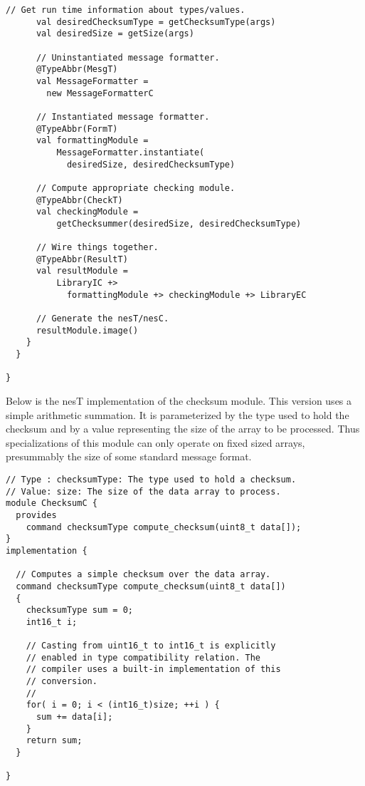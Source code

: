 \begin{lstlisting}[language=scalaness]
      // Get run time information about types/values.
      val desiredChecksumType = getChecksumType(args)
      val desiredSize = getSize(args)

      // Uninstantiated message formatter.
      @TypeAbbr(MesgT)
      val MessageFormatter =
        new MessageFormatterC

      // Instantiated message formatter.
      @TypeAbbr(FormT)
      val formattingModule =
          MessageFormatter.instantiate(
            desiredSize, desiredChecksumType)

      // Compute appropriate checking module.
      @TypeAbbr(CheckT)
      val checkingModule =
          getChecksummer(desiredSize, desiredChecksumType)
      
      // Wire things together.
      @TypeAbbr(ResultT)
      val resultModule =
          LibraryIC +>
            formattingModule +> checkingModule +> LibraryEC

      // Generate the nesT/nesC.
      resultModule.image()
    }
  }

}       
\end{lstlisting}
\vspace{1.0ex}
\primaryspacing

Below is the nesT implementation of the checksum module. This version uses a simple
arithmetic summation. It is parameterized by the type used to hold the checksum and by a value
representing the size of the array to be processed. Thus specializations of this module can only
operate on fixed sized arrays, presummably the size of some standard message format.

\singlespace
\vspace{1.0ex}
\begin{lstlisting}[language=nesC]
// Type : checksumType: The type used to hold a checksum.
// Value: size: The size of the data array to process.
module ChecksumC {
  provides
    command checksumType compute_checksum(uint8_t data[]);
}
implementation {
   
  // Computes a simple checksum over the data array.
  command checksumType compute_checksum(uint8_t data[])
  {
    checksumType sum = 0;
    int16_t i;
        
    // Casting from uint16_t to int16_t is explicitly
    // enabled in type compatibility relation. The
    // compiler uses a built-in implementation of this
    // conversion.
    //
    for( i = 0; i < (int16_t)size; ++i ) {
      sum += data[i];
    }
    return sum;
  }
    
}
\end{lstlisting}
\vspace{1.0ex}
\primaryspacing

